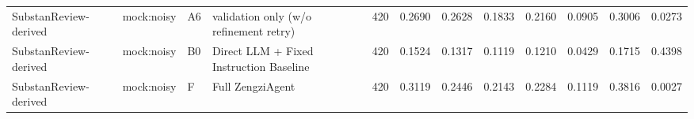 \begin{table}
\begin{tabular}{llllrrrrrlll}
SubstanReview-derived & mock:noisy & A6 & validation only (w/o refinement retry) & 420 & 0.2690 & 0.2628 & 0.1833 & 0.2160 & 0.0905 & 0.3006 & 0.0273 \\
SubstanReview-derived & mock:noisy & B0 & Direct LLM + Fixed Instruction Baseline & 420 & 0.1524 & 0.1317 & 0.1119 & 0.1210 & 0.0429 & 0.1715 & 0.4398 \\
SubstanReview-derived & mock:noisy & F & Full ZengziAgent & 420 & 0.3119 & 0.2446 & 0.2143 & 0.2284 & 0.1119 & 0.3816 & 0.0027 \\
\bottomrule
\end{tabular}
\end{table}
